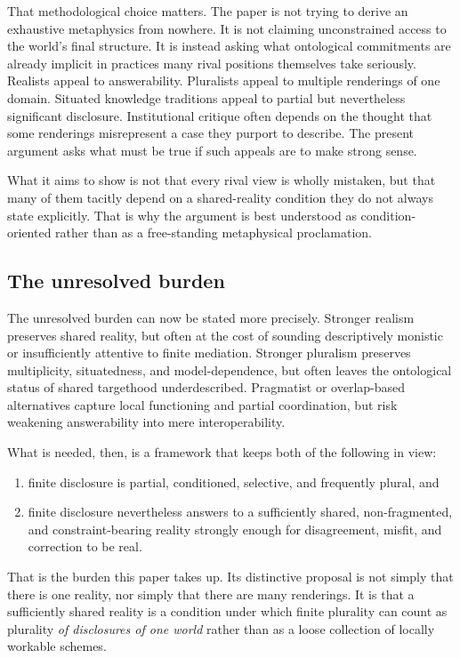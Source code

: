 \documentclass[11pt]{article}
\renewcommand{\emph}[1]{\textit{#1}}
\begin{document}
That methodological choice matters. The paper is not trying to derive an exhaustive metaphysics from nowhere. It is not claiming unconstrained access to the world's final structure. It is instead asking what ontological commitments are already implicit in practices many rival positions themselves take seriously. Realists appeal to answerability. Pluralists appeal to multiple renderings of one domain. Situated knowledge traditions appeal to partial but nevertheless significant disclosure. Institutional critique often depends on the thought that some renderings misrepresent a case they purport to describe. The present argument asks what must be true if such appeals are to make strong sense.

What it aims to show is not that every rival view is wholly mistaken, but that many of them tacitly depend on a shared-reality condition they do not always state explicitly. That is why the argument is best understood as condition-oriented rather than as a free-standing metaphysical proclamation.

\subsection{The unresolved burden}

The unresolved burden can now be stated more precisely. Stronger realism preserves shared reality, but often at the cost of sounding descriptively monistic or insufficiently attentive to finite mediation. Stronger pluralism preserves multiplicity, situatedness, and model-dependence, but often leaves the ontological status of shared targethood underdescribed. Pragmatist or overlap-based alternatives capture local functioning and partial coordination, but risk weakening answerability into mere interoperability.

What is needed, then, is a framework that keeps both of the following in view:

\begin{enumerate}
    \item finite disclosure is partial, conditioned, selective, and frequently plural, and
    \item finite disclosure nevertheless answers to a sufficiently shared, non-fragmented, and constraint-bearing reality strongly enough for disagreement, misfit, and correction to be real.
\end{enumerate}

That is the burden this paper takes up. Its distinctive proposal is not simply that there is one reality, nor simply that there are many renderings. It is that a sufficiently shared reality is a condition under which finite plurality can count as plurality \emph{of disclosures of one world} rather than as a loose collection of locally workable schemes.
\end{document}
